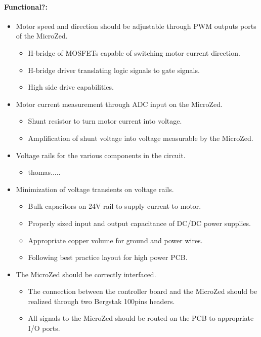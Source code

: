 \paragraph{Functional?:}
\begin{itemize}
	\item Motor speed and direction should be adjustable through PWM outputs ports of the MicroZed.
	\begin{itemize}
		\item H-bridge of MOSFETs capable of switching motor current direction.
		\item H-bridge driver translating logic signals to gate signals.
		\item High side drive capabilities.
	\end{itemize}

	\item Motor current measurement through ADC input on the MicroZed.
	\begin{itemize}
		\item Shunt resistor to turn motor current into voltage.
		\item Amplification of shunt voltage into voltage measurable by the MicroZed. 
	\end{itemize}

	\item Voltage rails for the various components in the circuit.
	\begin{itemize}
		\item thomas.....
	\end{itemize}

	\item Minimization of voltage transients on voltage rails.
	\begin{itemize}
		\item Bulk capacitors on 24V rail to supply current to motor.
		\item Properly sized input and output capacitance of DC/DC power supplies.
		\item Appropriate copper volume for ground and power wires.
		\item Following best practice layout for high power PCB. 
	\end{itemize}

	\item The MicroZed should be correctly interfaced.
	\begin{itemize}
		\item The connection between the controller board and the MicroZed should be realized through two Bergstak 100pins headers.
		\item All signals to the MicroZed should be routed on the PCB to appropriate I/O ports.
	\end{itemize}
	

\end{itemize}
